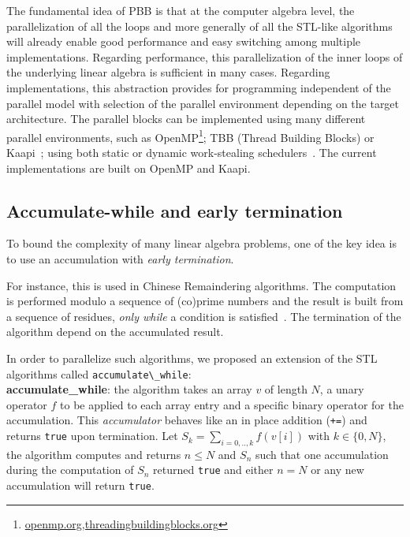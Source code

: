 \documentclass[runningheads,a4paper]{llncs}
\begin{document}
  
  The fundamental idea of PBB is that at the computer algebra
  level, the parallelization of all the loops and more generally of all
  the STL-like algorithms will already enable good performance and easy switching among multiple implementations.
Regarding performance, this parallelization of the inner loops of
the underlying linear algebra is sufficient in many cases.
Regarding implementations, this
abstraction provides for programming independent of the
parallel model with selection of the parallel environment
depending on the target architecture.
The parallel blocks can be implemented using many different parallel
environments, such as
OpenMP\footnote{\url{openmp.org,threadingbuildingblocks.org}}; 
TBB (Thread Building Blocks)
  \footnotemark[7] or
  Kaapi~\cite{inproceedingsgautier.gbp_ktsrsf_07}; using
  both static or dynamic work-stealing
  schedulers~\cite{con-traore.trmgb_08}.
The current implementations are built on OpenMP and Kaapi.

\subsection{Accumulate-while and early termination}
To bound the complexity of many linear algebra problems, one of the
key idea is to use an accumulation with {\em early termination}.

For instance, this is used in Chinese Remaindering algorithms. The
computation is performed modulo a sequence of (co)prime numbers and
the result is built from a sequence of residues, {\em only while} a
condition is satisfied~\cite{jgd:2010:crt}. 
The termination of the algorithm depend on the accumulated 
result.
  
In order to parallelize such algorithms, we proposed an extension of
the STL algorithms called \verb+accumulate\_while+:\\
{\bf accumulate\_while}: the algorithm takes an array $v$ of length $N$, a unary
  operator $f$ to be applied to each array entry and a specific binary
  operator for the accumulation.
  This {\em accumulator} behaves like an in place addition (\verb!+=!) and
  returns \texttt{true} upon termination.
  Let $S_k = \sum_{i=0,..,k} f( v[i])$ with 
  $k \in \{0,N\}$, the algorithm computes and returns $n \leq N$ and
  $S_n$ such that one accumulation during the computation of $S_n$
  returned \texttt{true} and either $n = N$ or any new accumulation
  will return \texttt{true}.
\end{document}
